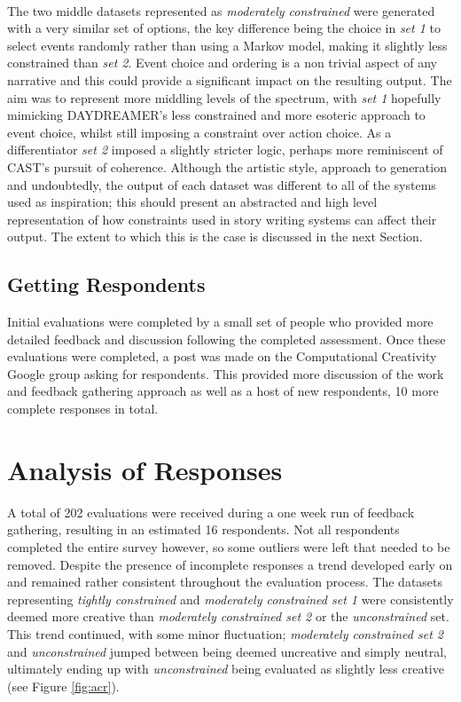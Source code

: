 \documentclass[letterpaper]{article}
\begin{document}
\\The two middle datasets represented as \emph{moderately constrained} were generated with a very similar set of options, the key difference being the choice in \emph{set 1} to select events randomly rather than using a Markov model, making it slightly less constrained than \emph{set 2}. Event choice and ordering is a non trivial aspect of any narrative and this could provide a significant impact on the resulting output. The aim was to represent more middling levels of the spectrum, with \emph{set 1} hopefully mimicking DAYDREAMER's less constrained and more esoteric approach to event choice, whilst still imposing a constraint over action choice. As a differentiator \emph{set 2} imposed a slightly stricter logic, perhaps more reminiscent of CAST's pursuit of coherence. Although the artistic style, approach to generation and undoubtedly, the output of each dataset was different to all of the systems used as inspiration; this should present an abstracted and high level representation of how constraints used in story writing systems can affect their output. The extent to which this is the case is discussed in the next Section.

\subsection{Getting Respondents}
Initial evaluations were completed by a small set of people who provided more detailed feedback and discussion following the completed assessment. Once these evaluations were completed, a post was made on the Computational Creativity Google group asking for respondents. This provided more discussion of the work and feedback gathering approach as well as a host of new respondents, 10 more complete responses in total. 

\section{Analysis of Responses}
A total of 202 evaluations were received during a one week run of feedback gathering, resulting in an estimated 16 respondents. Not all respondents completed the entire survey however, so some outliers were left that needed to be removed. 
Despite the presence of incomplete responses a trend developed early on and remained rather consistent throughout the evaluation process. The datasets representing \emph{tightly constrained} and \emph{moderately constrained set 1} were consistently deemed more creative than \emph{moderately constrained set 2} or the \emph{unconstrained} set. This trend continued, with some minor fluctuation; \emph{moderately constrained set 2} and \emph{unconstrained} jumped between being deemed uncreative and simply neutral,  ultimately ending up with \emph{unconstrained} being evaluated as slightly less creative (see Figure \ref{fig:acr}). 
\end{document}
